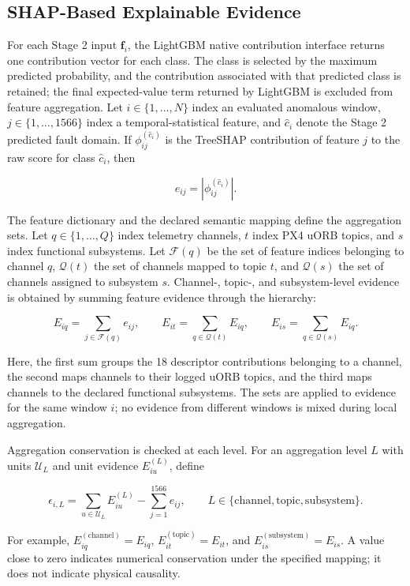 \subsection{SHAP-Based Explainable Evidence}
\label{sec:shap_evidence}

For each Stage 2 input $\mathbf{f}_i$, the LightGBM native contribution interface returns one contribution vector for each class. The class is selected by the maximum predicted probability, and the contribution associated with that predicted class is retained; the final expected-value term returned by LightGBM is excluded from feature aggregation. Let $i\in\{1,\ldots,N\}$ index an evaluated anomalous window, $j\in\{1,\ldots,1566\}$ index a temporal-statistical feature, and $\hat{c}_i$ denote the Stage 2 predicted fault domain. If $\phi_{ij}^{(\hat{c}_i)}$ is the TreeSHAP contribution of feature $j$ to the raw score for class $\hat{c}_i$, then

\[
e_{ij}=\left|\phi_{ij}^{(\hat{c}_i)}\right|.
\]

The feature dictionary and the declared semantic mapping define the aggregation sets. Let $q\in\{1,\ldots,Q\}$ index telemetry channels, $t$ index PX4 uORB topics, and $s$ index functional subsystems. Let $\mathcal{F}(q)$ be the set of feature indices belonging to channel $q$, $\mathcal{Q}(t)$ the set of channels mapped to topic $t$, and $\mathcal{Q}(s)$ the set of channels assigned to subsystem $s$. Channel-, topic-, and subsystem-level evidence is obtained by summing feature evidence through the hierarchy:

\[
E_{iq}=\sum_{j\in\mathcal{F}(q)}e_{ij},\qquad
E_{it}=\sum_{q\in\mathcal{Q}(t)}E_{iq},\qquad
E_{is}=\sum_{q\in\mathcal{Q}(s)}E_{iq}.
\]

Here, the first sum groups the 18 descriptor contributions belonging to a channel, the second maps channels to their logged uORB topics, and the third maps channels to the declared functional subsystems. The sets are applied to evidence for the same window $i$; no evidence from different windows is mixed during local aggregation.

Aggregation conservation is checked at each level. For an aggregation level $L$ with units $\mathcal{U}_L$ and unit evidence $E_{iu}^{(L)}$, define

\[
\epsilon_{i,L}=\sum_{u\in\mathcal{U}_L}E_{iu}^{(L)}-\sum_{j=1}^{1566}e_{ij},\qquad L\in\{\mathrm{channel},\mathrm{topic},\mathrm{subsystem}\}.
\]

For example, $E_{iq}^{(\mathrm{channel})}=E_{iq}$, $E_{it}^{(\mathrm{topic})}=E_{it}$, and $E_{is}^{(\mathrm{subsystem})}=E_{is}$. A value close to zero indicates numerical conservation under the specified mapping; it does not indicate physical causality.

